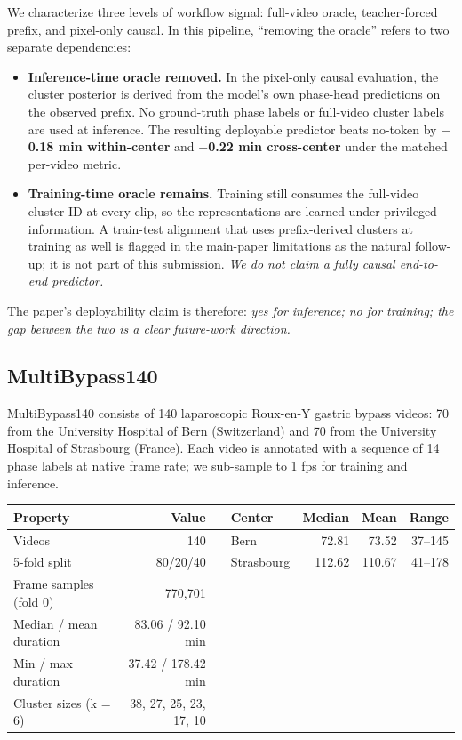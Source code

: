 We characterize three levels of workflow signal: full-video oracle,
teacher-forced prefix, and pixel-only causal. In this pipeline,
``removing the oracle'' refers to two separate dependencies:

\begin{itemize}
\tightlist
\item
  \textbf{Inference-time oracle removed.} In the pixel-only causal
  evaluation, the cluster posterior is derived from the model's own
  phase-head predictions on the observed prefix. No ground-truth phase
  labels or full-video cluster labels are used at inference. The
  resulting deployable predictor beats no-token by \textbf{$-$0.18 min
  within-center} and \textbf{$-$0.22 min cross-center} under the matched
  per-video metric.
\item
  \textbf{Training-time oracle remains.} Training still consumes the
  full-video cluster ID at every clip, so the representations are learned
  under privileged information. A train-test alignment that uses
  prefix-derived clusters at training as well is
  flagged in the main-paper limitations as the natural follow-up; it is not part of this
  submission. \emph{We do not claim a fully causal end-to-end
  predictor.}
\end{itemize}

The paper's deployability claim is therefore: \emph{yes for inference;
no for training; the gap between the two is a clear future-work
direction.}

\subsection{MultiBypass140}\label{multibypass140}

MultiBypass140 \citep{lavanchy2024multibypass} consists of 140 laparoscopic
Roux-en-Y gastric bypass videos: 70 from the University Hospital of Bern
(Switzerland) and 70 from the University Hospital of Strasbourg
(France). Each video is annotated with a sequence of 14 phase labels at
native frame rate; we sub-sample to 1 fps for training and inference.

\begin{longtable}[]{@{}lrllrrr@{}}
\toprule\noalign{}
Property & Value & & Center & Median & Mean & Range \\
\midrule\noalign{}
\endhead
\bottomrule\noalign{}
\endlastfoot
Videos & 140 & & Bern & 72.81 & 73.52 & 37--145 \\
5-fold split & 80/20/40 & & Strasbourg & 112.62 & 110.67 & 41--178 \\
Frame samples (fold 0) & 770,701 & & & & & \\
Median / mean duration & 83.06 / 92.10 min & & & & & \\
Min / max duration & 37.42 / 178.42 min & & & & & \\
Cluster sizes (k = 6) & 38, 27, 25, 23, 17, 10 & & & & & \\
\end{longtable}

